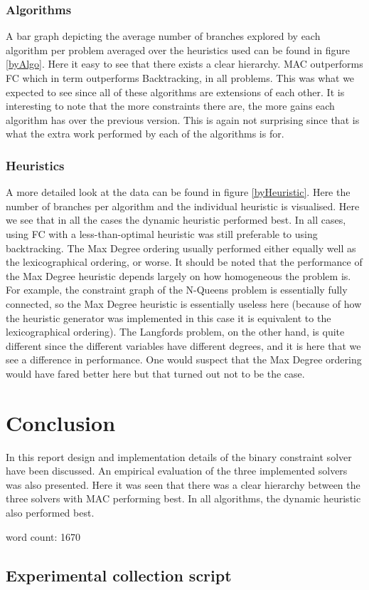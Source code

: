 \documentclass[british]{article}
\begin{document}
	\subsubsection{Algorithms}
	A bar graph depicting the average number of branches explored by each algorithm per problem averaged over the heuristics used can be found in figure \ref{byAlgo}. Here it easy to see that there exists a clear hierarchy. MAC outperforms FC which in term outperforms Backtracking, in all problems. This was what we expected to see since all of these algorithms are extensions of each other. It is interesting to note that the more constraints there are, the more gains each algorithm has over the previous version. This is again not surprising since that is what the extra work performed by each of the algorithms is for.
	
	
	\subsubsection{Heuristics}
	A more detailed look at the data can be found in figure \ref{byHeuristic}. Here the number of branches per algorithm and the individual heuristic is visualised. Here we see that in all the cases the dynamic heuristic performed best. In all cases, using FC with a less-than-optimal heuristic was still preferable to using backtracking. The Max Degree ordering usually performed either equally well as the lexicographical ordering, or worse. It should be noted that the performance of the Max Degree heuristic depends largely on how homogeneous the problem is. For example, the constraint graph of the N-Queens problem is essentially fully connected, so the Max Degree heuristic is essentially useless here (because of how the heuristic generator was implemented in this case it is equivalent to the lexicographical ordering). The Langfords problem, on the other hand, is quite different since the different variables have different degrees, and it is here that we see a difference in performance. One would suspect that the Max Degree ordering would have fared better here but that turned out not to be the case.  
	
	\section{Conclusion}
	\label{conclusion}
	In this report design and implementation details of the binary constraint solver have been discussed. An empirical evaluation of the three implemented solvers was also presented. Here it was seen that there was a clear hierarchy between the three solvers with MAC performing best. In all algorithms, the dynamic heuristic also performed best.
	
	word count: 1670
	\printbibliography
	
	\begin{appendices}
		\section{Experimental collection script}
		\label{collection}
		
	\end{appendices}
	
	
\end{document}
